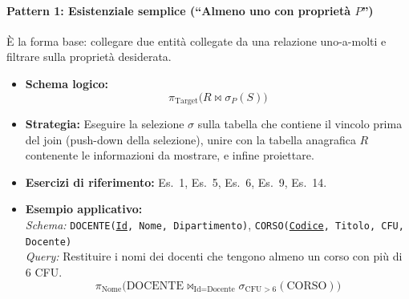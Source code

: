 \documentclass[12pt]{extarticle}
\begin{document}
\paragraph{Pattern 1: Esistenziale semplice (``Almeno uno con proprietà $P$'')}
È la forma base: collegare due entità collegate da una relazione uno-a-molti e filtrare sulla proprietà desiderata.
\begin{itemize}
    \item \textbf{Schema logico:}
    \[
    \pi_{\text{Target}} \big( R \bowtie \sigma_{P}(S) \big)
    \]
    \item \textbf{Strategia:} Eseguire la selezione $\sigma$ sulla tabella che contiene il vincolo prima del join (push-down della selezione), unire con la tabella anagrafica $R$ contenente le informazioni da mostrare, e infine proiettare.
    \item \textbf{Esercizi di riferimento:} Es.~1, Es.~5, Es.~6, Es.~9, Es.~14.
    \item \textbf{Esempio applicativo:}\\
    \textit{Schema:} \texttt{DOCENTE(\underline{Id}, Nome, Dipartimento)}, \texttt{CORSO(\underline{Codice}, Titolo, CFU, Docente)}\\
    \textit{Query:} Restituire i nomi dei docenti che tengono almeno un corso con più di 6 CFU.
    \[
    \pi_{\text{Nome}} \big( \text{DOCENTE} \bowtie_{\text{Id} = \text{Docente}} \sigma_{\text{CFU} > 6}(\text{CORSO}) \big)
    \]
\end{itemize}

\end{document}
